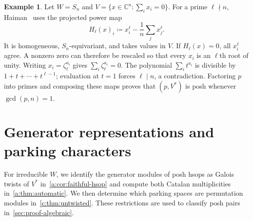 \documentclass[10pt,a4paper]{amsart}
\newcommand{\defeq}{\coloneqq}
\theoremstyle{definition}
\newtheorem{example}[theorem]{Example}
\newcommand{\C}{\mathbb C}\newcommand{\Q}{\mathbb Q}
\begin{document}
\begin{example}\label{c:ex:haiman}
Let $W=S_n$ and $V=\{x\in\C^n:\sum_i x_i=0\}$.
For a prime $\ell\nmid n$, Haiman~\cite[Proposition~2.5.4]{Haiman}
uses the projected power map
\begin{equation}\label{c:eq:haiman-projection}
 H_\ell(x)_i\defeq x_i^\ell-\frac1n\sum_jx_j^\ell.
\end{equation}
It is homogeneous, $S_n$-equivariant, and takes values in $V$.
If $H_\ell(x)=0$, all $x_i^\ell$ agree. A nonzero zero can therefore
be rescaled so that every $x_i$ is an $\ell$th root of unity.
Writing $x_i=\zeta_\ell^{a_i}$ gives
$\sum_i\zeta_\ell^{a_i}=0$. The polynomial
$\sum_i t^{a_i}$ is divisible by $1+t+\cdots+t^{\ell-1}$;
evaluation at $t=1$ forces $\ell\mid n$, a contradiction.
Factoring $p$ into primes and composing these maps proves that
$(p,V^*)$ is posh whenever $\gcd(p,n)=1$.
\end{example}


\section{Generator representations and parking characters}\label{sec:generators}

For irreducible $W$, we identify the generator modules of posh hsops
as Galois twists of $V^*$ in~\cref{a:cor:faithful-hsop} and compute
both Catalan multiplicities in~\cref{a:thm:automatic}.
We then determine which parking spaces are permutation modules
in~\cref{c:thm:untwisted}. These restrictions are used to classify
posh pairs in~\cref{sec:proof-algebraic}.
\end{document}
